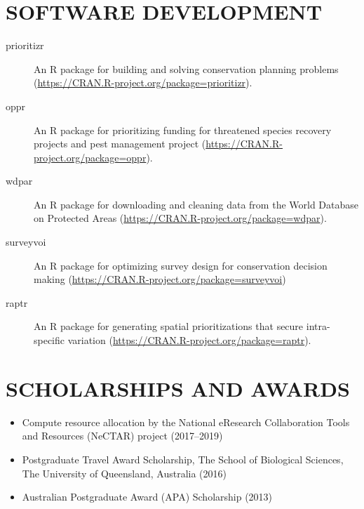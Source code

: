 \documentclass[12pt,a4paper]{article}
\begin{document}
\section*{SOFTWARE DEVELOPMENT}
\begin{description}

\item[prioritizr] An R package for building and solving conservation planning problems (\url{https://CRAN.R-project.org/package=prioritizr}).

\item[oppr] An R package for prioritizing funding for threatened species recovery projects and pest management project (\url{https://CRAN.R-project.org/package=oppr}).

\item[wdpar] An R package for downloading and cleaning data from the World Database on Protected Areas (\url{https://CRAN.R-project.org/package=wdpar}).

\item[surveyvoi] An R package for optimizing survey design for conservation decision making (\url{https://CRAN.R-project.org/package=surveyvoi})

\item[raptr] An R package for generating spatial prioritizations that secure intra-specific variation (\url{https://CRAN.R-project.org/package=raptr}).

\end{description}

\section*{SCHOLARSHIPS AND AWARDS}
\begin{itemize}

\item Compute resource allocation by the National eResearch Collaboration Tools and Resources (NeCTAR) project (2017--2019)

\item Postgraduate Travel Award Scholarship, The School of Biological Sciences, The University of Queensland, Australia (2016)

\item Australian Postgraduate Award (APA) Scholarship (2013)

\end{itemize}
\end{document}
